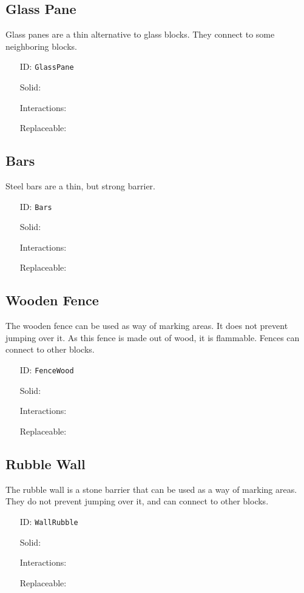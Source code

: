 \subsection{Glass Pane}\label{subsec:blocks_glass pane}
Glass panes are a thin alternative to glass blocks.
They connect to some neighboring blocks.
\newline
\begin{itemize}[nosep]
    \item[ID:] \texttt{GlassPane}
    \item[Solid:]  \Checkmark \item[Interactions:]  \XSolidBrush \item[Replaceable:]  \XSolidBrush
\end{itemize}

\subsection{Bars}\label{subsec:blocks_bars}
Steel bars are a thin, but strong barrier.
\newline
\begin{itemize}[nosep]
    \item[ID:] \texttt{Bars}
    \item[Solid:]  \Checkmark \item[Interactions:]  \XSolidBrush \item[Replaceable:]  \XSolidBrush
\end{itemize}

\subsection{Wooden Fence}\label{subsec:blocks_wooden fence}
The wooden fence can be used as way of marking areas. It does not prevent jumping over it.
As this fence is made out of wood, it is flammable. Fences can connect to other blocks.
\newline
\begin{itemize}[nosep]
    \item[ID:] \texttt{FenceWood}
    \item[Solid:]  \Checkmark \item[Interactions:]  \XSolidBrush \item[Replaceable:]  \XSolidBrush
\end{itemize}

\subsection{Rubble Wall}\label{subsec:blocks_rubble wall}
The rubble wall is a stone barrier that can be used as a way of marking areas.
They do not prevent jumping over it, and can connect to other blocks.
\newline
\begin{itemize}[nosep]
    \item[ID:] \texttt{WallRubble}
    \item[Solid:]  \Checkmark \item[Interactions:]  \XSolidBrush \item[Replaceable:]  \XSolidBrush
\end{itemize}


